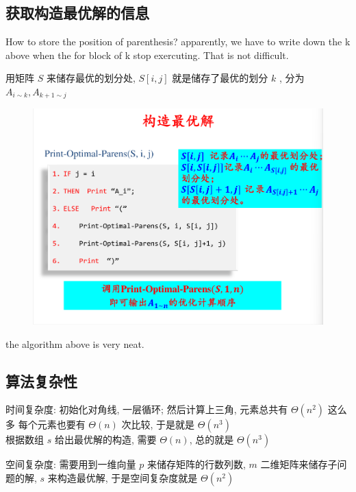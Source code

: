 \documentclass[a4paper, 10pt]{ctexart} %
\begin{document}
\subsection{获取构造最优解的信息}
How to store the position of parenthesis? apparently, we have to write down the k above when the for block
of k stop exercuting. That is not difficult.

用矩阵 $S$ 来储存最优的划分处, $S \left[ i, j  \right]$ 就是储存了最优的划分 $k$ , 分为 $A_{i \sim k}, A_{k+1 \sim j}$
\begin{figure}[H]
    \centering
    \includegraphics[scale = 0.5]{9.png}
\end{figure}
the algorithm above is very neat.
\subsection{算法复杂性}
时间复杂度: 初始化对角线, 一层循环; 然后计算上三角, 元素总共有 $\Theta \left(n ^{2}\right)$ 这么多
每个元素也要有 $\Theta \left(n\right)$ 次比较, 于是就是 $\Theta \left(n^{3}\right)$
\\根据数组 $s$ 给出最优解的构造, 需要 $\Theta \left(n\right)$, 总的就是 $\Theta \left(n ^{3}\right)$

空间复杂度: 需要用到一维向量 $p$ 来储存矩阵的行数列数, $m$ 二维矩阵来储存子问题的解, $s$ 来构造最优解, 于是空间复杂度就是 $\Theta \left(n^{2}\right)$
\end{document}
